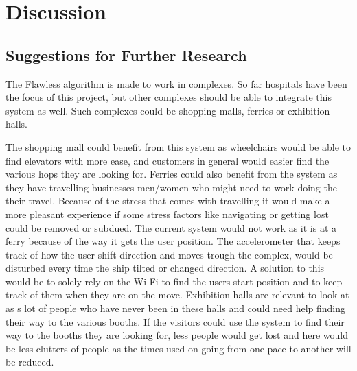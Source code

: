 \chapter{Discussion}

\section{Suggestions for Further Research}
The Flawless algorithm is made to work in complexes. So far hospitals have been the focus of this project, but other complexes should be able to integrate this system as well. Such complexes could be shopping malls, ferries or exhibition halls. 

The shopping mall could benefit from this system as wheelchairs would be able to find elevators with more ease, and customers in general would easier find the various hops they are looking for. Ferries could also benefit from the system as they have travelling businesses men/women who might need to work doing the their travel. Because of the stress that comes with travelling\cite{future_stress} it would make a more pleasant experience if some stress factors like navigating or getting lost could be removed or subdued. The current system would not work as it is at a ferry because of the way it gets the user position. The accelerometer that keeps track of how the user shift direction and moves trough the complex, would be disturbed every time the ship tilted or changed direction. A solution to this would be to solely rely on the Wi-Fi to find the users start position and to keep track of them when they are on the move. Exhibition halls are relevant to look at as s lot of people who have never been in these halls and could need help finding their way to the various booths. If the visitors could use the system to find their way to the booths they are looking for, less people would get lost and here would be less clutters of people as the times used on going from one pace to another will be reduced.
